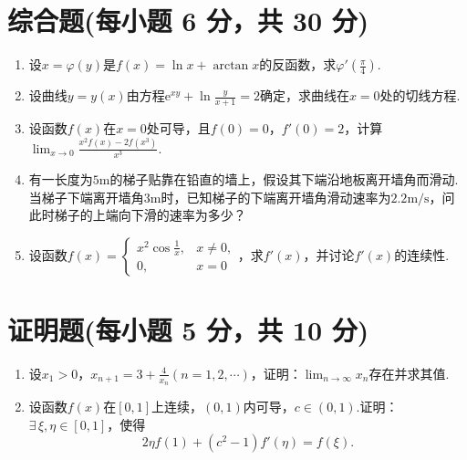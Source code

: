\documentclass[../Main.tex]{subfiles}
\begin{document}
  \section{综合题(每小题 6 分，共 30 分)}
  \begin{enumerate}
    \item[11.] 设$x=\varphi(y)$是$f(x)=\ln x+\arctan x$的反函数，求$\varphi'\left
      (\frac{\pi}{4}\right)$.
      \vspace{10em}

    \item[12.] 设曲线$y=y(x)$由方程$\mathrm{e}^{xy}+\ln\frac{y}{x+1}=2$确定，求曲线在$x
      =0$处的切线方程.
      \vspace{10em}

    \item[13.] 设函数$f(x)$在$x=0$处可导，且$f(0)=0$，$f'(0)=2$，计算$\lim_{x\to0}
      \frac{x^{2}f(x)-2f(x^{3})}{x^{3}}$.
      \vspace{10em}

    \item[14.] 有一长度为$5\mathrm{m}$的梯子贴靠在铅直的墙上，假设其下端沿地板离开墙角而滑动.当梯子下端离开墙角$3
      \mathrm{m}$时，已知梯子的下端离开墙角滑动速率为$2.2\mathrm{m/s}$，问此时梯子的上端向下滑的速率为多少？
      \vspace{10em}

    \item[15.] 设函数$f(x)=
      \begin{cases}
        x^{2}\cos\frac{1}{x}, & x\neq0, \\
        0,                    & x=0
      \end{cases}$，求$f'(x)$，并讨论$f'(x)$的连续性.
      \vspace{12em}
  \end{enumerate}

  \section{证明题(每小题 5 分，共 10 分)}
  \begin{enumerate}
    \item[16.] 设$x_{1}>0$，$x_{n+1}=3+\frac{4}{x_{n}}(n=1,2,\cdots)$，证明：$\lim
      _{n\to\infty}x_{n}$存在并求其值.
      \vspace{12em}

    \item[17.] 设函数$f(x)$在$[0,1]$上连续，$(0,1)$内可导，$c\in(0,1)$.证明：$\exists
      \,\xi,\eta\in[0,1]$，使得
      \[
        2\eta f(1)+(c^{2}-1)f'(\eta)=f(\xi).
      \]
      \vspace{10em}
  \end{enumerate}
\end{document}
